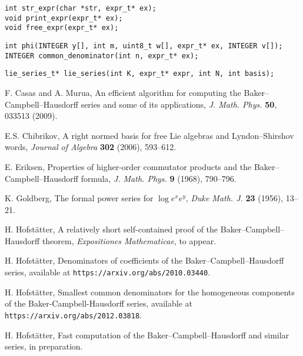 \documentclass[11pt,a4paper]{article}
\begin{document}
\begin{verbatim}
int str_expr(char *str, expr_t* ex);
void print_expr(expr_t* ex);
void free_expr(expr_t* ex);
\end{verbatim}

\begin{verbatim}
int phi(INTEGER y[], int m, uint8_t w[], expr_t* ex, INTEGER v[]);
INTEGER common_denominator(int n, expr_t* ex);
\end{verbatim}

\begin{verbatim}
lie_series_t* lie_series(int K, expr_t* expr, int N, int basis);
\end{verbatim}




\begin{thebibliography}{10}\footnotesize

F. Casas and A. Murua, An efficient algorithm for computing the Baker--Campbell--Hausdorff series
and some of its applications, {\em J. Math. Phys.} {\bf 50}, 033513 (2009).

E.S. Chibrikov, A right normed basis for free Lie algebras and Lyndon--Shirshov
  words, {\em Journal of Algebra} {\bf 302} (2006), 593--612.


 E. Eriksen, Properties of higher-order commutator products and the
    Baker--Campbell--Hausdorff formula, {\em J. Math. Phys.} {\bf 9} (1968), 790--796.

 K. Goldberg, The formal power series for $\log e^x e^y$, {\it Duke Math. J.} {\bf 23} (1956), 13--21.

 H. Hofst\"atter, A relatively short self-contained proof of the Baker--Campbell--Hausdorff theorem, {\it Expositiones Mathematicae}, to appear. %


 H. Hofst\"atter, Denominators of coefficients of the Baker--Campbell--Hausdorff series, available at {\tt https://arxiv.org/abs/2010.03440}.

 H. Hofst\"atter, Smallest common denominators for the homogeneous components of the Baker-Campbell-Hausdorff series, available at {\tt https://arxiv.org/abs/2012.03818}.

 H. Hofst\"atter, Fast computation of the Baker--Campbell--Hausdorff and similar series, in preparation.



\end{thebibliography}
\end{document}
